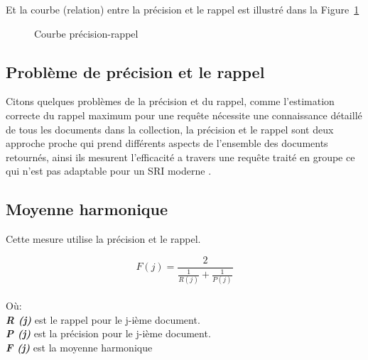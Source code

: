 Et la courbe (relation) entre la précision et le rappel est illustré dans la Figure~\ref{fig:example-prec-rec-courbe}
\begin{figure}[htbp]
	\begin{center}
	\end{center}
	\caption{Courbe précision-rappel \citep{evaluation-sri-cours}}\label{fig:example-prec-rec-courbe}
\end{figure}

\subsection{Problème de précision et le rappel}
Citons quelques problèmes de la précision et du rappel, comme l'estimation correcte du rappel maximum pour une requête nécessite une connaissance détaillé de tous les documents dans la collection, la précision et le rappel sont deux approche proche qui prend différents aspects de l'ensemble des documents retournés, ainsi ils mesurent l'efficacité a travers une requête traité en groupe ce qui n'est pas adaptable pour un SRI moderne \citep{modern-ir}.

\subsection{Moyenne harmonique}
Cette mesure utilise la précision et le rappel.

\[
	F(j) = \frac{2}{\frac{1}{R(j)} + \frac{1}{P(j)}}
\]
\\Où:\\
\textbf{\textit{R (j)}} est le rappel pour le j-ième document.\\
\textbf{\textit{P (j)}} est la précision pour le j-ième document.\\
\textbf{\textit{F (j)}} est la moyenne harmonique

